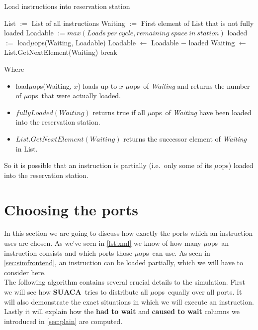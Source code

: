 \documentclass[a4paper,12pt,titlepage, twoside]{report}
\newcommand{\suaca}{\textbf{SUACA}}
\newcommand{\microops}{$\mu$ops}
\begin{document}
\begin{algorithm}[H]
    \SetAlgoLined
    \caption{Load instructions into reservation station}
    List $:=$ List of all instructions\;
    Waiting $:=$ First element of List that is not fully loaded\;
    Loadable $:= max(Loads\ per\ cycle, remaining\ space\ in\ station)$\;
     {
        loaded $:=$ load\microops(Waiting, Loadable)\;
        Loadable $\leftarrow$ Loadable $-$ loaded\;
         {
            Waiting $\leftarrow$ List.GetNextElement(Waiting)\;
        } {
            break\;
        }
    }
\end{algorithm}

Where
\begin{itemize}
    \item load\microops(Waiting, $x$) loads up to $x$ \microops\ of \emph{Waiting} and returns the number of \microops\ that were actually loaded.
    \item $fullyLoaded(Waiting)$ returns true if all \microops\ of \emph{Waiting} have been loaded into the reservation station.
    \item $List.GetNextElement(Waiting)$ returns the successor element of \emph{Waiting} in List.
\end{itemize}

So it is possible that an instruction is partially (i.e.\ only some of its \microops) loaded into the reservation station.

\section{Choosing the ports}
\label{sec:chooseport}

In this section we are going to discuss how exactly the ports which an instruction uses are chosen. As we've seen in \autoref{lst:xml} we know of how many \microops\ an instruction consists and which ports those \microops\ can use. As seen in \autoref{sec:simfrontend}, an instruction can be loaded partially, which we will have to consider here.\\
The following algorithm contains several crucial details to the simulation. First we will see how \suaca\ tries to distribute all \microops\ equally over all ports. It will also demonstrate the exact situations in which we will execute an instruction. Lastly it will explain how the \textbf{had to wait} and \textbf{caused to wait} columns we introduced in \autoref{sec:plain} are computed. 
\end{document}
